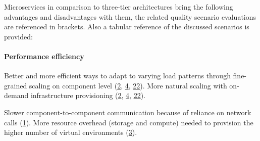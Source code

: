 Microservices in comparison to three-tier architectures bring the following advantages and disadvantages with them, the related quality scenario evaluations are referenced in brackets. Also a tabular reference of the discussed scenarios is provided:

\paragraph{Performance efficiency} 
\begin{itemize}
\pro Better and more efficient ways to adapt to varying load patterns through fine-grained scaling on component level (\hyperref[quaMicro:s2]{2}, \hyperref[quaMicro:s4]{4}, \hyperref[quaMicro:s22]{22}).
\pro More natural scaling with on-demand infrastructure provisioning (\hyperref[quaMicro:s2]{2}, \hyperref[quaMicro:s4]{4}, \hyperref[quaMicro:s22]{22}).

\con Slower component-to-component communication because of reliance on network calls (\hyperref[quaMicro:s1]{1}).
\con More resource overhead (storage and compute) needed to provision the higher number of virtual environments (\hyperref[quaMicro:s3]{3}).
\end{itemize}

